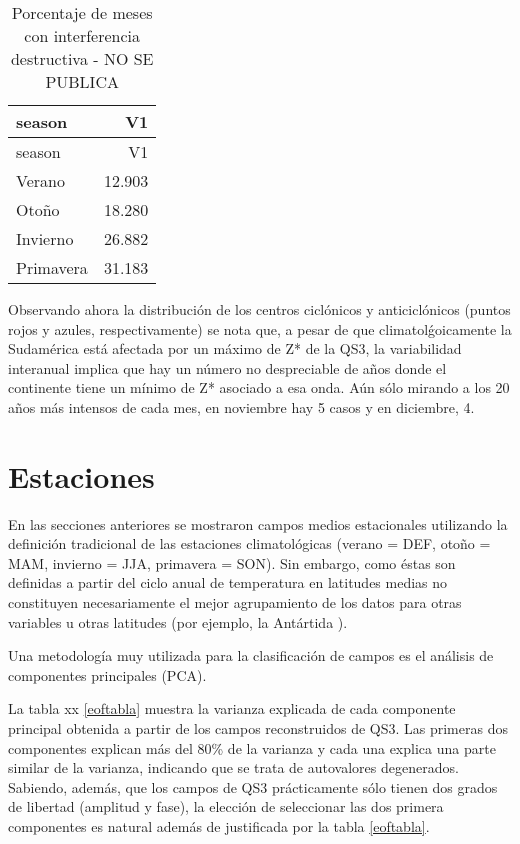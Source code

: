 \documentclass[spanish,a4paper]{book}
\begin{document}
\begin{longtable}[]{@{}lr@{}}
\caption{Porcentaje de meses con interferencia destructiva - NO SE
PUBLICA}\tabularnewline
\toprule
season & V1\tabularnewline
\midrule
\endfirsthead
\toprule
season & V1\tabularnewline
\midrule
\endhead
Verano & 12.903\tabularnewline
Otoño & 18.280\tabularnewline
Invierno & 26.882\tabularnewline
Primavera & 31.183\tabularnewline
\bottomrule
\end{longtable}

Observando ahora la distribución de los centros ciclónicos y
anticiclónicos (puntos rojos y azules,
respectivamente)
se nota que, a pesar de que climatolǵoicamente la Sudamérica está
afectada por un máximo de Z* de la QS3, la variabilidad interanual
implica que hay un número no despreciable de años donde el continente
tiene un mínimo de Z* asociado a esa onda. Aún sólo mirando a los 20
años más intensos de cada mes, en noviembre hay 5 casos y en diciembre,
4.

\section{Estaciones}\label{estaciones}

En las secciones anteriores se mostraron campos medios estacionales
utilizando la definición tradicional de las estaciones climatológicas
(verano = DEF, otoño = MAM, invierno = JJA, primavera = SON). Sin
embargo, como éstas son definidas a partir del ciclo anual de
temperatura en latitudes medias no constituyen necesariamente el mejor
agrupamiento de los datos para otras variables u otras latitudes (por
ejemplo, la Antártida ).

Una metodología muy utilizada para la clasificación de campos es el
análisis de componentes principales
(PCA).

La tabla xx \ref{eoftabla} muestra la
varianza explicada de cada componente principal obtenida a partir de los
campos reconstruidos de QS3. Las primeras dos componentes explican más
del 80\% de la varianza y cada una explica una parte similar de la
varianza, indicando que se trata de autovalores
degenerados. Sabiendo, además, que los campos
de QS3 prácticamente sólo tienen dos grados de libertad (amplitud y
fase), la elección de seleccionar las dos primera componentes es natural
además de justificada por la tabla \ref{eoftabla}.
\end{document}
